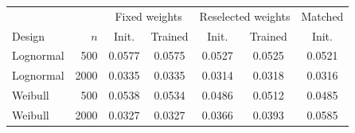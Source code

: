 \begin{tabular}{lrccccc}
\toprule
 & & \multicolumn{2}{c}{Fixed weights} & \multicolumn{2}{c}{Reselected weights} & Matched \\
Design & $n$ & Init. & Trained & Init. & Trained & Init. \\
\midrule
Lognormal & 500 & 0.0577 & 0.0575 & 0.0527 & 0.0525 & 0.0521 \\
Lognormal & 2000 & 0.0335 & 0.0335 & 0.0314 & 0.0318 & 0.0316 \\
Weibull & 500 & 0.0538 & 0.0534 & 0.0486 & 0.0512 & 0.0485 \\
Weibull & 2000 & 0.0327 & 0.0327 & 0.0366 & 0.0393 & 0.0585 \\
\bottomrule
\end{tabular}

